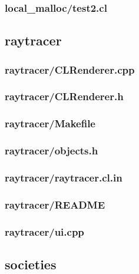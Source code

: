 \documentclass{article}
\begin{document}
\subsubsection*{local\_malloc/test2.cl}


\subsection*{raytracer}
\subsubsection*{raytracer/CLRenderer.cpp}


\subsubsection*{raytracer/CLRenderer.h}


\subsubsection*{raytracer/Makefile}


\subsubsection*{raytracer/objects.h}


\subsubsection*{raytracer/raytracer.cl.in}


\subsubsection*{raytracer/README}


\subsubsection*{raytracer/ui.cpp}


\subsection*{societies}
\end{document}
